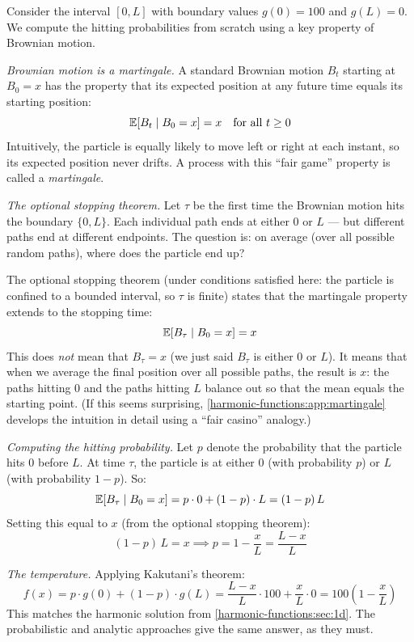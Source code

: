 \begin{notechapter}
\begin{example}
Consider the interval $[0, L]$ with boundary values $g(0) = 100$ and
$g(L) = 0$. We compute the hitting probabilities from scratch using a
key property of Brownian motion.

\emph{Brownian motion is a martingale.} A standard Brownian motion $B_t$
starting at $B_0 = x$ has the property that its expected position at any
future time equals its starting position:
\[
\mathbb{E}[B_t \mid B_0 = x] = x \quad \text{for all } t \geq 0
\]
Intuitively, the particle is equally likely to move left or right at each
instant, so its expected position never drifts. A process with this
``fair game'' property is called a \emph{martingale}.

\emph{The optional stopping theorem.} Let $\tau$ be the first time the
Brownian motion hits the boundary $\{0, L\}$. Each individual path ends at
either $0$ or $L$ --- but different paths end at different endpoints. The
question is: on average (over all possible random paths), where does the
particle end up?

The optional stopping theorem (under conditions satisfied here: the
particle is confined to a bounded interval, so $\tau$ is finite) states
that the martingale property extends to the stopping time:
\[
\mathbb{E}[B_\tau \mid B_0 = x] = x
\]
This does \emph{not} mean that $B_\tau = x$ (we just said $B_\tau$ is
either $0$ or $L$). It means that when we average the final position over
all possible paths, the result is $x$: the paths hitting $0$ and the paths
hitting $L$ balance out so that the mean equals the starting point. (If this
seems surprising, \cref{harmonic-functions:app:martingale} develops the intuition in
detail using a ``fair casino'' analogy.)

\emph{Computing the hitting probability.} Let $p$ denote the probability
that the particle hits $0$ before $L$. At time $\tau$, the particle is at
either $0$ (with probability $p$) or $L$ (with probability $1-p$). So:
\[
\mathbb{E}[B_\tau \mid B_0 = x] = p \cdot 0 + (1-p) \cdot L = (1-p)\,L
\]
Setting this equal to $x$ (from the optional stopping theorem):
\[
(1-p)\,L = x \implies p = 1 - \frac{x}{L} = \frac{L-x}{L}
\]

\emph{The temperature.} Applying Kakutani's theorem:
\[
f(x) = p \cdot g(0) + (1-p) \cdot g(L)
= \frac{L-x}{L} \cdot 100 + \frac{x}{L} \cdot 0
= 100\left(1 - \frac{x}{L}\right)
\]
This matches the harmonic solution from \cref{harmonic-functions:sec:1d}. The
probabilistic and analytic approaches give the same answer, as they must.
\end{example}


\end{notechapter}
